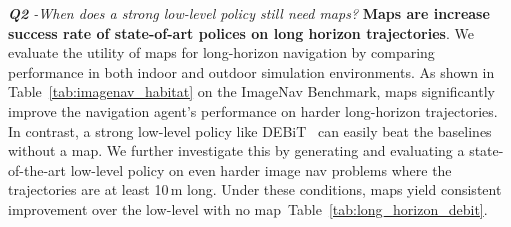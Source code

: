 \textit{\textbf{Q2} -When does a strong low-level policy still need maps?}
\textbf{Maps are increase success rate of state-of-art polices on long horizon trajectories}.
We evaluate the utility of maps for long-horizon navigation by comparing performance in both indoor and outdoor simulation environments. As shown in Table~\ref{tab:imagenav_habitat} on the ImageNav Benchmark, maps significantly improve the navigation agent's performance on harder long-horizon trajectories. In contrast, a strong low-level policy like DEBiT~\cite{bono2024end} can easily beat the baselines without a map. We further investigate this by generating and evaluating a state-of-the-art low-level policy on even harder image nav problems where the trajectories are at least 10\,m long. Under these conditions, maps yield consistent improvement over the low-level with no map~Table~\ref{tab:long_horizon_debit}.

